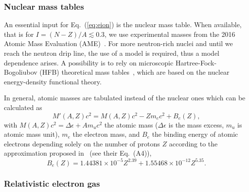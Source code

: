 \subsubsection{Nuclear mass tables}

An essential input for Eq.~(\ref{eq:eion}) is the nuclear mass table. When
available, that is for $I = (N-Z)/A \lesssim 0.3$, we use experimental masses
from the 2016 Atomic Mass Evaluation (AME)~\cite{Huang2017}. For more neutron-rich
nuclei and until we reach the neutron drip line, the use of a model is
required, thus a model dependence arises. A possibility is to rely on 
microscopic Hartree-Fock-Bogoliubov (HFB) theoretical mass
tables~\cite{Samyn2002}, which are based on the nuclear energy-density 
functional theory.

In general, atomic masses are tabulated instead of the nuclear ones which can 
be calculated as
%
\begin{equation}
  M'(A,Z)c^2 = M(A,Z)c^2 - Zm_ec^2 + B_{e}(Z),\label{eq:ionmass}
\end{equation}
%
with $M(A,Z)c^2 = \Delta \epsilon + Am_uc^2$ the atomic mass ($\Delta \epsilon$
is the mass excess, $m_u$ is atomic mass unit), $m_e$ the electron mass, and 
$B_e$ the binding energy of atomic electrons depending solely on the 
number of protons $Z$ according to the approximation proposed
in~\cite{Lunney2003} (see their Eq.~(A4)),
%
\begin{equation}
  B_e(Z) = 1.44381\times 10^{-5}Z^{2.39} + 1.55468\times 10^{-12}Z^{5.35}.
\end{equation}

\subsubsection{Relativistic electron gas}\label{subsubsec:elgas}

